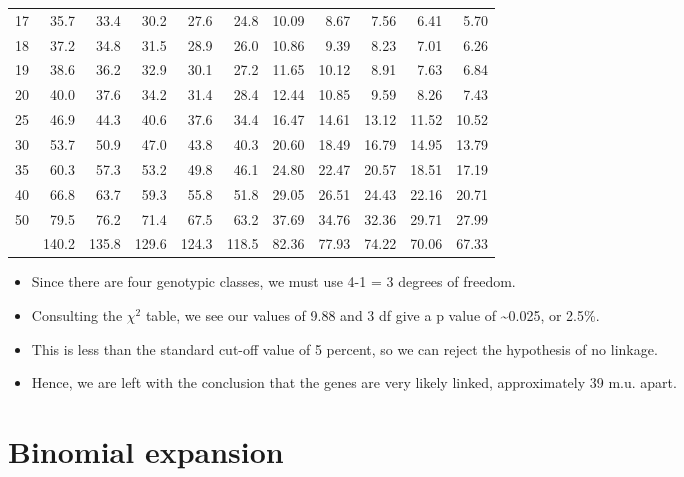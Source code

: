 \documentclass[11pt,ignorenonframetext,aspectratio=169]{beamer}
\providecommand{\tightlist}{%
  \setlength{\itemsep}{0pt}\setlength{\parskip}{0pt}}
\begin{document}
\begin{frame}{}
\begin{table}
\begin{tabular}[t]{lrrrr|>{}rrrrrr}
\rowcolor{gray!6}  17 & 35.7 & 33.4 & 30.2 & 27.6 & 24.8 & 10.09 & 8.67 & 7.56 & 6.41 & 5.70\\
18 & 37.2 & 34.8 & 31.5 & 28.9 & 26.0 & 10.86 & 9.39 & 8.23 & 7.01 & 6.26\\
\rowcolor{gray!6}  19 & 38.6 & 36.2 & 32.9 & 30.1 & 27.2 & 11.65 & 10.12 & 8.91 & 7.63 & 6.84\\
20 & 40.0 & 37.6 & 34.2 & 31.4 & 28.4 & 12.44 & 10.85 & 9.59 & 8.26 & 7.43\\
\addlinespace
\rowcolor{gray!6}  25 & 46.9 & 44.3 & 40.6 & 37.6 & 34.4 & 16.47 & 14.61 & 13.12 & 11.52 & 10.52\\
30 & 53.7 & 50.9 & 47.0 & 43.8 & 40.3 & 20.60 & 18.49 & 16.79 & 14.95 & 13.79\\
\rowcolor{gray!6}  35 & 60.3 & 57.3 & 53.2 & 49.8 & 46.1 & 24.80 & 22.47 & 20.57 & 18.51 & 17.19\\
40 & 66.8 & 63.7 & 59.3 & 55.8 & 51.8 & 29.05 & 26.51 & 24.43 & 22.16 & 20.71\\
\rowcolor{gray!6}  50 & 79.5 & 76.2 & 71.4 & 67.5 & 63.2 & 37.69 & 34.76 & 32.36 & 29.71 & 27.99\\
\addlinespace
100 & 140.2 & 135.8 & 129.6 & 124.3 & 118.5 & 82.36 & 77.93 & 74.22 & 70.06 & 67.33\\
\bottomrule
\end{tabular}
\end{table}
\end{frame}

\begin{frame}{}
\protect\hypertarget{section-4}{}
\begin{itemize}
\tightlist
\item
  Since there are four genotypic classes, we must use 4-1 = 3 degrees of
  freedom.
\item
  Consulting the \(\chi^2\) table, we see our values of 9.88 and 3 df
  give a p value of \textasciitilde0.025, or 2.5\%.
\item
  This is less than the standard cut-off value of 5 percent, so we can
  reject the hypothesis of no linkage.
\item
  Hence, we are left with the conclusion that the genes are very likely
  linked, approximately 39 m.u. apart.
\end{itemize}
\end{frame}

\hypertarget{binomial-expansion}{%
\section{Binomial expansion}\label{binomial-expansion}}
\end{document}
